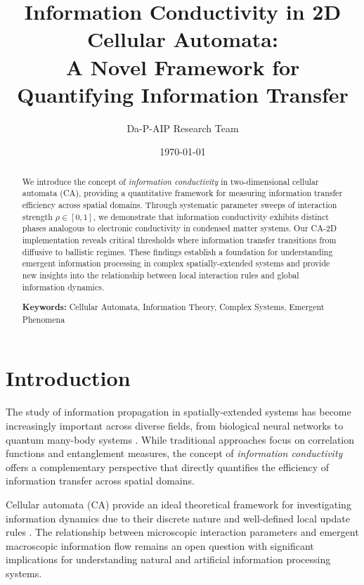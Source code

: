 \documentclass[twocolumn,showpacs,preprintnumbers,amsmath,amssymb,prb]{revtex4-2}
\begin{document}

\title{Information Conductivity in 2D Cellular Automata: \\
A Novel Framework for Quantifying Information Transfer}

\author{Da-P-AIP Research Team}

\date{\today}

\begin{abstract}
We introduce the concept of \emph{information conductivity} in two-dimensional cellular automata (CA), providing a quantitative framework for measuring information transfer efficiency across spatial domains. Through systematic parameter sweeps of interaction strength $\rho \in [0,1]$, we demonstrate that information conductivity exhibits distinct phases analogous to electronic conductivity in condensed matter systems. Our CA-2D implementation reveals critical thresholds where information transfer transitions from diffusive to ballistic regimes. These findings establish a foundation for understanding emergent information processing in complex spatially-extended systems and provide new insights into the relationship between local interaction rules and global information dynamics.

\textbf{Keywords:} Cellular Automata, Information Theory, Complex Systems, Emergent Phenomena
\end{abstract}


\maketitle

\section{Introduction}

The study of information propagation in spatially-extended systems has become increasingly important across diverse fields, from biological neural networks to quantum many-body systems \cite{nielsen2010quantum}. While traditional approaches focus on correlation functions and entanglement measures, the concept of \emph{information conductivity} offers a complementary perspective that directly quantifies the efficiency of information transfer across spatial domains.

Cellular automata (CA) provide an ideal theoretical framework for investigating information dynamics due to their discrete nature and well-defined local update rules \cite{wolfram2002new}. The relationship between microscopic interaction parameters and emergent macroscopic information flow remains an open question with significant implications for understanding natural and artificial information processing systems.
\end{document}
